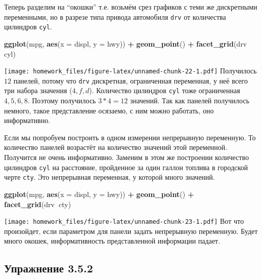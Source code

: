 \documentclass[]{book}
\newenvironment{Shaded}{\begin{snugshade}}{\end{snugshade}}
\newcommand{\KeywordTok}[1]{\textcolor[rgb]{0.13,0.29,0.53}{\textbf{#1}}}
\newcommand{\DataTypeTok}[1]{\textcolor[rgb]{0.13,0.29,0.53}{#1}}
\newcommand{\StringTok}[1]{\textcolor[rgb]{0.31,0.60,0.02}{#1}}
\newcommand{\OperatorTok}[1]{\textcolor[rgb]{0.81,0.36,0.00}{\textbf{#1}}}
\newcommand{\NormalTok}[1]{#1}
\begin{document}
Теперь разделим на ``окошки'' т.е. возьмём срез графиков с теми же
дискретными переменными, но в разрезе типа привода автомобиля
\texttt{drv} от количества цилиндров \texttt{cyl}.

\begin{Shaded}
\begin{Highlighting}[]
\KeywordTok{ggplot}\NormalTok{(mpg, }\KeywordTok{aes}\NormalTok{(}\DataTypeTok{x =}\NormalTok{ displ, }\DataTypeTok{y =}\NormalTok{ hwy)) }\OperatorTok{+}
\StringTok{  }\KeywordTok{geom_point}\NormalTok{() }\OperatorTok{+}
\StringTok{  }\KeywordTok{facet_grid}\NormalTok{(drv}\OperatorTok{~}\StringTok{ }\NormalTok{cyl)}
\end{Highlighting}
\end{Shaded}

\texttt{[image: homework\_files/figure-latex/unnamed-chunk-22-1.pdf]}
Получилось \(12\) панелей, потому что \texttt{drv} дискретная,
ограниченная переменная, у неё всего три набора значения (\(4, f, d\)).
Количество цилиндров \texttt{cyl} тоже ограниченная \(4,5,6,8\). Поэтому
получилось \(3*4=12\) значений. Так как панелей получилось немного,
такое представление осязаемо, с ним можно работать, оно информативно.

Если мы попробуем построить в одном измерении непрерывную переменную. То
количество панелей возрастёт на количество значений этой переменной.
Получится не очень информативно. Заменим в этом же построении количество
цилиндров \texttt{cyl} на расстояние, пройденное за один галлон топлива
в городской черте \texttt{cty}. Это непрерывная переменная, у которой
много значений.

\begin{Shaded}
\begin{Highlighting}[]
\KeywordTok{ggplot}\NormalTok{(mpg, }\KeywordTok{aes}\NormalTok{(}\DataTypeTok{x =}\NormalTok{ displ, }\DataTypeTok{y =}\NormalTok{ hwy)) }\OperatorTok{+}
\StringTok{ }\KeywordTok{geom_point}\NormalTok{() }\OperatorTok{+}
\StringTok{ }\KeywordTok{facet_grid}\NormalTok{(drv}\OperatorTok{~}\NormalTok{cty)}
\end{Highlighting}
\end{Shaded}

\texttt{[image: homework\_files/figure-latex/unnamed-chunk-23-1.pdf]} Вот
что произойдет, если параметром для панели задать непрерывную
переменную. Будет много окошек, информативность представленной
информации падает.

\subsection*{Упражнение 3.5.2}\label{-3.5.2}
\end{document}
